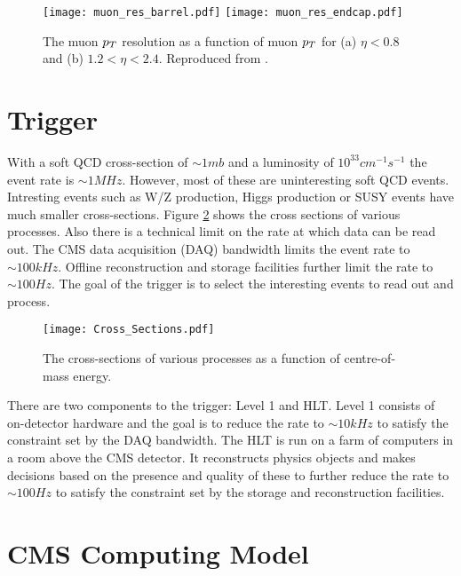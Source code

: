 \begin{figure}
\texttt{[image: muon\_res\_barrel.pdf]}
\texttt{[image: muon\_res\_endcap.pdf]}
\caption{The muon $p_{T}$ resolution as a function of muon $p_{T}$ for (a) $\eta <
0.8$ and (b) $1.2 < \eta < 2.4$. Reproduced from \cite{muon_resolution}.}
\label{fig:muon_resolution}
\end{figure}

\section{Trigger}

With a soft QCD cross-section of $\sim1\unit{mb}$ and a luminosity of
$10^{33}\unit{cm^{-1}s^{-1}}$ 
the event rate is $\sim 1
\unit{MHz}$. However, most of these are uninteresting soft QCD events. Intresting events such
as W/Z production, Higgs production or SUSY events have much smaller 
cross-sections. Figure \ref{fig:cross_sections} shows the cross sections of
various processes. Also there is a technical limit on the rate at which data can
be read out. The CMS data acquisition (DAQ) bandwidth limits the event rate to 
$\sim 100\unit{kHz}$. Offline reconstruction and storage facilities further limit the
rate to $\sim 100\unit{Hz}$. The goal of the trigger is to select the interesting 
events to read out and process. \\

\begin{figure}
\begin{center}
\texttt{[image: Cross\_Sections.pdf]}
\end{center}
\caption{The cross-sections of various processes as a function of centre-of-mass
energy.}
\label{fig:cross_sections}
\end{figure}

There are two components to the trigger: Level 1 and HLT. Level 1 consists of
on-detector hardware and the goal is to reduce the rate to $\sim 10\unit{kHz}$ to
satisfy the constraint set by the DAQ bandwidth. The HLT is run on a farm of 
computers in a room above the CMS detector. It reconstructs physics objects 
and makes decisions based on the presence and quality of these to further reduce
the rate to $\sim 100\unit{Hz}$ to satisfy the constraint set by the storage and 
reconstruction facilities.

\section{CMS Computing Model}

